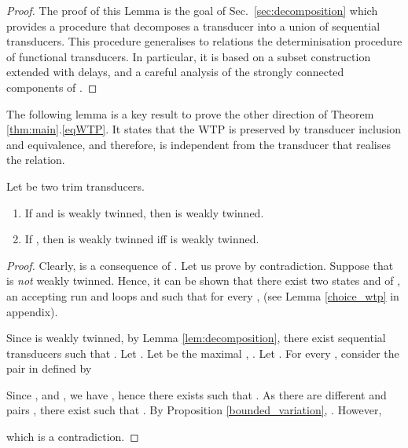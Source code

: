 \documentclass[envcountsame]{llncs}
\newcommand\eof{\hfill}
\begin{document}
\begin{proof}
The proof of this Lemma is the goal of Sec.~\ref{sec:decomposition}
which provides a procedure that decomposes a transducer  into a
union of sequential transducers. This procedure generalises to
relations the determinisation procedure of functional transducers. In
particular, it is based on a subset construction extended with delays, 
and a careful analysis of the strongly connected components of
. \eof
\end{proof}


The following lemma is a key result to prove the other direction of
Theorem \ref{thm:main}.\ref{eqWTP}. It states that the WTP is
preserved by transducer inclusion and
equivalence, and therefore, is independent from the transducer that
realises the relation. 

\begin{lemma}\label{lem:preserve}
    Let  be two trim transducers. 
\vspace{-1mm}
    \begin{enumerate}
        \item If  and 
          is weakly twinned, then  is weakly twinned. 
        \item If , then  is
          weakly twinned iff  is weakly twinned.
    \end{enumerate}
\end{lemma}

\vspace{-2mm}
\begin{proof}
Clearly,  is a consequence of . Let us prove  by
contradiction. Suppose that  is \emph{not} weakly twinned. 
\vspace{-1mm}
Hence, it can be shown that there exist two 
states  and 
of , an accepting run  and
loops  and  such that for every ,  
(see Lemma \ref{choice_wtp} in appendix).


Since  is weakly twinned, by Lemma \ref{lem:decomposition},
there exist sequential transducers  such that .
Let .
Let  be the maximal , .
Let .
For every , consider the pair  in  defined by
\vspace{-1mm}

Since , and
, we have , hence there exists  such that .
As there are  different  and  pairs
, there exist  such that
.
By Proposition \ref{bounded_variation}, .
However,
\vspace{-1mm}

which is a contradiction.\eof
\end{proof}  
\end{document}
